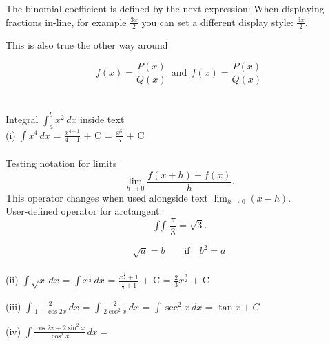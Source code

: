 \documentclass{article}
\DeclareMathOperator{\arctg}{\int\int}
\begin{document}
The binomial coefficient is defined by the next expression:
When displaying fractions in-line, for example \(\frac{3x}{2}\) 
you can set a different display style: 
\( \displaystyle \frac{3x}{2} \).

This is also true the other way around

\[ f(x)=\frac{P(x)}{Q(x)} \ \ \textrm{and} 
\ \ f(x)=\textstyle\frac{P(x)}{Q(x)} \] \\\\

 Integral \(\int_{a}^{b} x^2 \,dx\) inside text	\\

(i) \(\int x^4 \, dx\) = \(\frac{x^{4 + 1}}{4 + 1}\) + C = \(\frac{x^5}{5}\) + C \\\\




Testing notation for limits
\[
    \lim_{h \to 0 } \frac{f(x+h)-f(x)}{h}
.\]
This operator changes when used alongside 
text \( \lim_{h \to 0} (x-h) \). \\

User-defined operator for arctangent:
\[
    \arctg \frac{\pi}{3} = \sqrt{3}
.\]

\[ \sqrt{a}=b \qquad \text{if} \quad b^2=a \] \\

(ii) \(\int \sqrt{x}\, dx\) = \(\int x^\frac{1}{2}\, dx\) = \(\frac{x^\frac{1}{2} + 1}{\frac{1}{2} + 1}\) + C = \(\frac{2}{3}x^\frac{3}{2}\) + C

(iii) \(\int \frac{2}{1 - \cos{2x}} \, dx \) = \(\int \frac{2}{2\cos^2{x}} \, dx\) = \(\int \sec^2{x} \, dx\) = \(\tan{x} + C\)

(iv) \(\int \frac{\cos{2x} + 2\sin^2{x}}{\cos^2{x}} \, dx = \)
\end{document}
